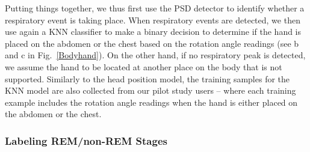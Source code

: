 {Putting things together, we thus first use the PSD detector to identify whether a respiratory event is taking place. When respiratory
events are detected, we }then use again a KNN classifier to make a binary decision to determine if the hand is placed on the abdomen or the
chest based on the rotation angle readings (see b and c in Fig.~\ref{Bodyhand}). {On the other hand, if no respiratory peak is detected, we
assume the hand to be located at another place on the body that is not supported. } Similarly to the head position model, the training
samples for the KNN model are also collected from our pilot study users -- where each training example includes the rotation angle readings
when the hand is either placed on the abdomen or the chest.

\subsubsection{Labeling REM/non-REM Stages}

